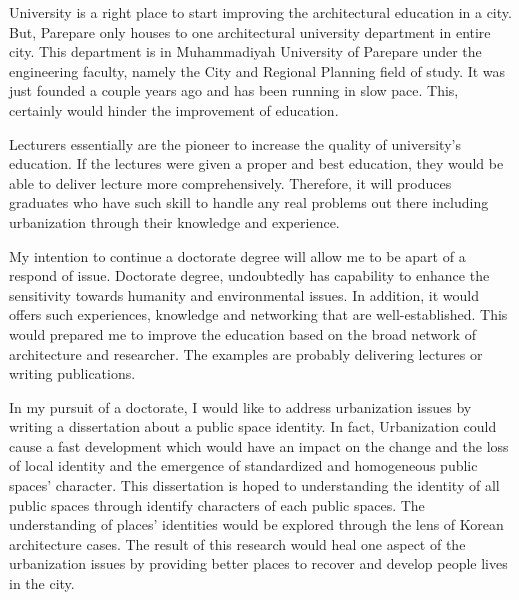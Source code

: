 \documentclass[11pt]{simart} %
\begin{document}
University is a right place to start improving the architectural education in a city.
But, Parepare only houses to one architectural university department in entire city.
This department is in Muhammadiyah University of Parepare under the engineering faculty, namely the City and Regional Planning field of study.
It was just founded a couple years ago and has been running in slow pace. This, certainly would hinder the improvement of education.

Lecturers essentially are the pioneer to increase the quality of university's education.
If the lectures were given a proper and best education, they would be able to deliver lecture more comprehensively.
Therefore, it will produces graduates who have such skill to handle any real problems out there including urbanization through their knowledge and experience.

My intention to continue a doctorate degree will allow me to be apart of a respond of issue.
Doctorate degree, undoubtedly has capability to enhance the sensitivity towards humanity and environmental issues.
In addition, it would offers such experiences, knowledge and networking that are well-established.
This would prepared me to improve the education based on the broad network of architecture and researcher. The examples are probably delivering lectures or writing publications.


In my pursuit of a doctorate, I would like to address urbanization issues by writing a dissertation about  a public space identity. In fact, Urbanization  could cause a fast development which would have an impact on the change and the loss of local identity and the emergence of standardized and homogeneous public spaces' character.  This dissertation is hoped to understanding the identity of all public spaces through identify characters of each public spaces. The understanding of places' identities would be explored through the lens of Korean architecture cases. The result of this research would heal one aspect of the urbanization issues by providing better places to recover and develop people lives in the city.
\end{document}
